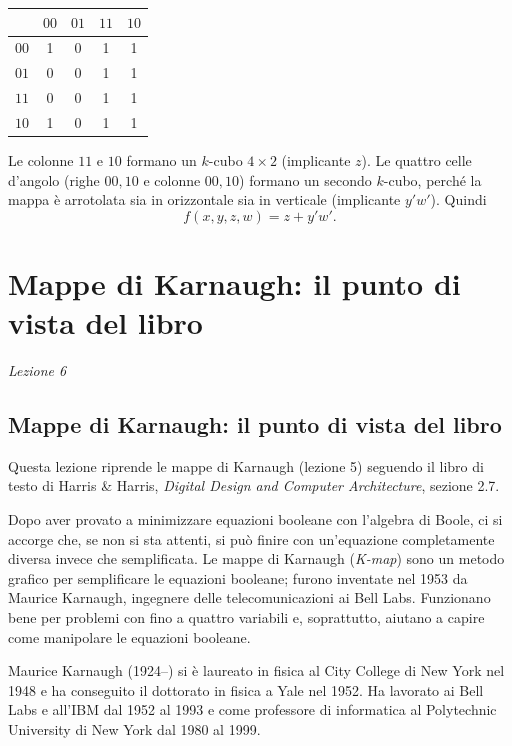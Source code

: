 \documentclass[11pt,a4paper]{article}
\begin{document}
\begin{esempio}
\begin{center}
\begin{tabular}{c|cccc}
 & $00$ & $01$ & $11$ & $10$ \\
\midrule
$00$ & 1 & 0 & 1 & 1 \\
$01$ & 0 & 0 & 1 & 1 \\
$11$ & 0 & 0 & 1 & 1 \\
$10$ & 1 & 0 & 1 & 1 \\
\end{tabular}
\end{center}
Le colonne $11$ e $10$ formano un $k$-cubo $4 \times 2$ (implicante $z$). Le quattro celle d'angolo (righe $00,10$ e colonne $00,10$) formano un secondo $k$-cubo, perché la mappa è arrotolata sia in orizzontale sia in verticale (implicante $y'w'$). Quindi
\[
f(x,y,z,w) = z + y'w'.
\]
\end{esempio}

\section[Mappe di Karnaugh: il punto di vista del libro (Lezione 6)]{Mappe di Karnaugh: il punto di vista del libro}
\noindent\emph{Lezione 6}
\subsection{Mappe di Karnaugh: il punto di vista del libro}

Questa lezione riprende le mappe di Karnaugh (lezione 5) seguendo il libro di testo di Harris \& Harris, \emph{Digital Design and Computer Architecture}, sezione 2.7.

Dopo aver provato a minimizzare equazioni booleane con l'algebra di Boole, ci si accorge che, se non si sta attenti, si può finire con un'equazione completamente diversa invece che semplificata. Le mappe di Karnaugh (\emph{K-map}) sono un metodo grafico per semplificare le equazioni booleane; furono inventate nel 1953 da Maurice Karnaugh, ingegnere delle telecomunicazioni ai Bell Labs. Funzionano bene per problemi con fino a quattro variabili e, soprattutto, aiutano a capire come manipolare le equazioni booleane.

\begin{osservazione}
Maurice Karnaugh (1924--) si è laureato in fisica al City College di New York nel 1948 e ha conseguito il dottorato in fisica a Yale nel 1952. Ha lavorato ai Bell Labs e all'IBM dal 1952 al 1993 e come professore di informatica al Polytechnic University di New York dal 1980 al 1999.
\end{osservazione}
\end{document}
